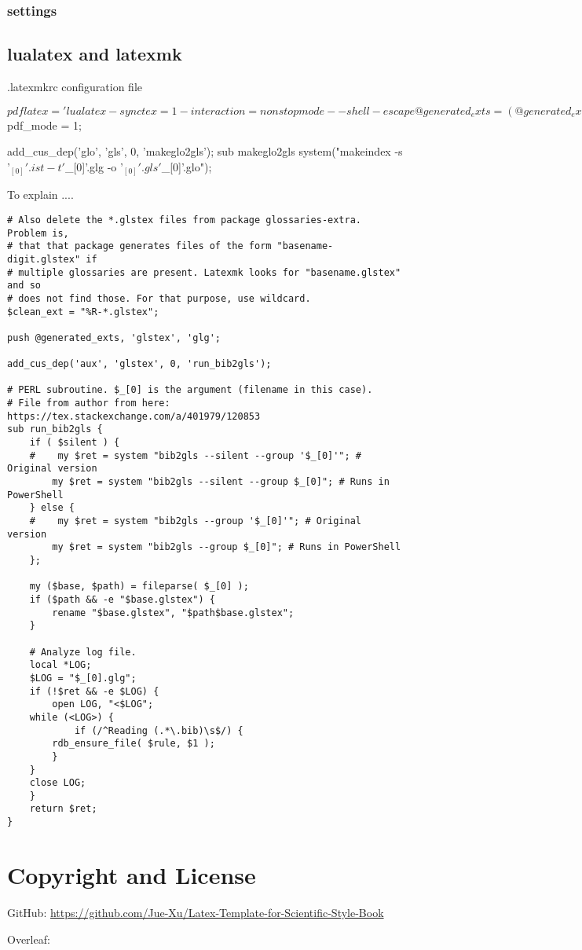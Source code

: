 \subsubsection{settings}

\subsection{lualatex and latexmk}
.latexmkrc configuration file
\begin{verbatim*}
	$pdflatex = 'lualatex -synctex=1 -interaction=nonstopmode --shell-escape %O %S';
	@generated_exts = (@generated_exts, 'synctex.gz');
	$pdf_mode = 1;

	add_cus_dep('glo', 'gls', 0, 'makeglo2gls');
	sub makeglo2gls {
		system("makeindex -s '$_[0]'.ist -t '$_[0]'.glg -o '$_[0]'.gls '$_[0]'.glo");
	}
\end{verbatim*}
To explain ....
\begin{verbatim}
# Also delete the *.glstex files from package glossaries-extra. Problem is,
# that that package generates files of the form "basename-digit.glstex" if
# multiple glossaries are present. Latexmk looks for "basename.glstex" and so
# does not find those. For that purpose, use wildcard.
$clean_ext = "%R-*.glstex";

push @generated_exts, 'glstex', 'glg';

add_cus_dep('aux', 'glstex', 0, 'run_bib2gls');

# PERL subroutine. $_[0] is the argument (filename in this case).
# File from author from here: https://tex.stackexchange.com/a/401979/120853
sub run_bib2gls {
    if ( $silent ) {
    #    my $ret = system "bib2gls --silent --group '$_[0]'"; # Original version
        my $ret = system "bib2gls --silent --group $_[0]"; # Runs in PowerShell
    } else {
    #    my $ret = system "bib2gls --group '$_[0]'"; # Original version
        my $ret = system "bib2gls --group $_[0]"; # Runs in PowerShell
    };

    my ($base, $path) = fileparse( $_[0] );
    if ($path && -e "$base.glstex") {
        rename "$base.glstex", "$path$base.glstex";
    }

    # Analyze log file.
    local *LOG;
    $LOG = "$_[0].glg";
    if (!$ret && -e $LOG) {
        open LOG, "<$LOG";
    while (<LOG>) {
            if (/^Reading (.*\.bib)\s$/) {
        rdb_ensure_file( $rule, $1 );
        }
    }
    close LOG;
    }
    return $ret;
}
\end{verbatim}

\section{Copyright and License}
GitHub: \url{https://github.com/Jue-Xu/Latex-Template-for-Scientific-Style-Book}

Overleaf: 
